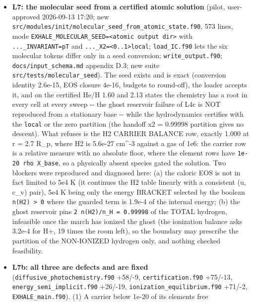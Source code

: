 \documentclass[english,a4paper]{my_memo}
\begin{document}
\begin{itemize}
  escape only through an archived solved seed, which no molecular group has,
  and the restart contract rightly refuses an atomic seed for a molecular run
  (\texttt{mol} and \texttt{carrier} decide the unknown count, K44).
\item
  \textbf{L7: the molecular seed from a certified atomic solution} (pilot,
  user-approved 2026-09-13 17:20; new
  \texttt{src/modules/init/molecular\_seed\_from\_atomic\_state.f90}, 573 lines, mode
  \texttt{EXHALE\_MOLECULAR\_SEED=\textless{}atomic\ output\ dir\textgreater{}} with \texttt{...\_INVARIANT=p\textbar{}T} and
  \texttt{...\_X2=\textless{}0..1\textgreater{}\textbar{}local}; \texttt{load\_IC.f90} lets the six molecular tokens differ
  only in a seed conversion; \texttt{write\_output.f90}; \texttt{docs/input\_schema.md}
  appendix D.3; new suite \texttt{src/tests/molecular\_seed}). The seed exists and is
  exact (conversion identity 2.6e-15, EOS closure 4e-16, budgets to
  round-off), the loader accepts it, and on the certified He/H 1.60 and 2.13
  states the chemistry has a root in every cell at every sweep -\/- the ghost
  reservoir failure of L4c is NOT reproduced from a stationary base -\/- while
  the hydrodynamics certifies with the \texttt{local} or the zero partition (the
  handoff x2 = 0.99998 partition gives no descent). What refuses is the H2
  CARRIER BALANCE row, exactly 1.000 at r = 2.7 R\_p, where H2 is 5.6e-27
  cm\^{}-3 against a gas of 1e6: the carrier row is a relative measure with no
  absolute floor, where the element rows have \texttt{1e-20\ rho\ X\_base}, so a
  physically absent species gated the solution. Two blockers were reproduced
  and diagnosed here: (a) the caloric EOS is not in fact limited to 5e4 K (it
  continues the H2 table linearly with a consistent (u, c\_v) pair), 5e4 K
  being only the energy BRACKET selected by the boolean \texttt{n(H2)\ \textgreater{}\ 0} where the
  guarded term is 1.9e-4 of the internal energy; (b) the ghost reservoir pins
  \texttt{2\ n(H2)/n\_H\ =\ 0.99998} of the TOTAL hydrogen, infeasible once the march
  has ionized the ghost (the ionization balance asks 3.2e-4 for H+, 19 times
  the room left), so the boundary may prescribe the partition of the
  NON-IONIZED hydrogen only, and nothing checked feasibility.
\item
  \textbf{L7b: all three are defects and are fixed}
  (\texttt{diffusive\_photochemistry.f90} +58/-9, \texttt{certification.f90} +75/-13,
  \texttt{energy\_semi\_implicit.f90} +26/-19, \texttt{ionization\_equilibrium.f90} +71/-2,
  \texttt{EXHALE\_main.f90}). (1) A carrier below 1e-20 of its element\textquotesingle s free

\end{itemize}
\end{document}
